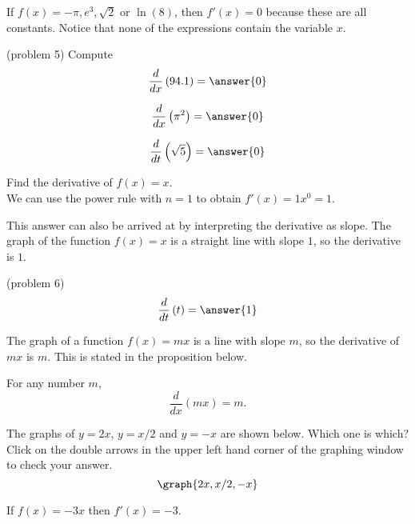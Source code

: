 \documentclass{ximera}
\begin{document}
\begin{example}[example 5]
If $f(x) = -\pi, e^3, \sqrt 2$ or $\ln(8)$, then $f'(x) = 0$ 
because these are all constants. Notice that none of the expressions contain the variable $x$.
\end{example}



\begin{problem}(problem 5)
Compute
\[
\frac{d}{dx} \left(94.1\right) = \answer{0}
\]

\[
\frac{d}{dx} \left(\pi^2\right) = \answer{0}
\]

\[
\frac{d}{dt} \left( \sqrt 5 \right) = \answer{0}
\]


\end{problem}



\begin{example}[example 6]
Find the derivative of $f(x) = x$.\\
We can use the power rule with $n=1$ to obtain $f'(x) = 1x^0 = 1$. 

\begin{remark}
This answer can also be arrived at by interpreting the derivative as slope. The graph of the function $f(x) = x$ is a straight line with slope $1$,
so the derivative is $1$.  
\end{remark}
\end{example}

\begin{problem}(problem 6)
\[
\frac{d}{dt}\left(t\right) = \answer{1}
\]
\end{problem}

The graph of a function $f(x) = mx$
is a line with slope $m$, so the derivative of $mx$ is $m$. This is stated in the proposition below.
 
\begin{proposition}

For any number $m$,
\[
\frac{d}{dx} (mx) = m.
\]
\end{proposition}


The graphs of $y = 2x$, $y = x/2$ and $y = -x$ are shown below.
Which one is which? Click on the double arrows in the upper left hand corner of the graphing window to check your answer.
\[
\graph{2x, x/2, -x}
\]



\begin{example}[example 7]
If $f(x) = -3x$ then $f'(x) = -3$.
\end{example}
\end{document}

